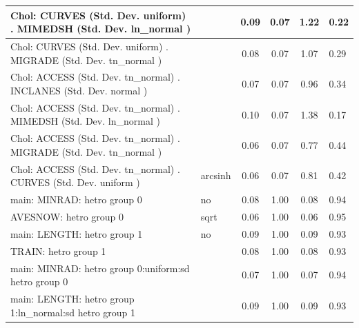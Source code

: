 \begin{table}
\begin{center}
\begin{tabular}{|l|l|c|c|c|l|}
			\hline
			 Chol: CURVES (Std. Dev. uniform) . MIMEDSH (Std. Dev.   ln_normal ) &  & 0.09 & 0.07 & 1.22 & 0.22 \\
			\hline
			 Chol: CURVES (Std. Dev. uniform) . MIGRADE (Std. Dev.   tn_normal ) &  & 0.08 & 0.07 & 1.07 & 0.29 \\
			\hline
			 Chol: ACCESS (Std. Dev. tn_normal) . INCLANES (Std. Dev.   normal ) &  & 0.07 & 0.07 & 0.96 & 0.34 \\
			\hline
			 Chol: ACCESS (Std. Dev. tn_normal) . MIMEDSH (Std. Dev.   ln_normal ) &  & 0.10 & 0.07 & 1.38 & 0.17 \\
			\hline
			 Chol: ACCESS (Std. Dev. tn_normal) . MIGRADE (Std. Dev.   tn_normal ) &  & 0.06 & 0.07 & 0.77 & 0.44 \\
			\hline
			 Chol: ACCESS (Std. Dev. tn_normal) . CURVES (Std. Dev.   uniform ) & arcsinh & 0.06 & 0.07 & 0.81 & 0.42 \\
			\hline
			main: MINRAD: hetro group 0 & no & 0.08 & 1.00 & 0.08 & 0.94 \\
			\hline
			AVESNOW: hetro group 0 & sqrt & 0.06 & 1.00 & 0.06 & 0.95 \\
			\hline
			main: LENGTH: hetro group 1 & no & 0.09 & 1.00 & 0.09 & 0.93 \\
			\hline
			TRAIN: hetro group 1 &  & 0.08 & 1.00 & 0.08 & 0.93 \\
			\hline
			main: MINRAD: hetro group 0:uniform:sd  hetro group 0 &  & 0.07 & 1.00 & 0.07 & 0.94 \\
			\hline
			main: LENGTH: hetro group 1:ln_normal:sd  hetro group 1 &  & 0.09 & 1.00 & 0.09 & 0.93 \\
			\hline
		\end{tabular}
	\end{center}
\end{table}